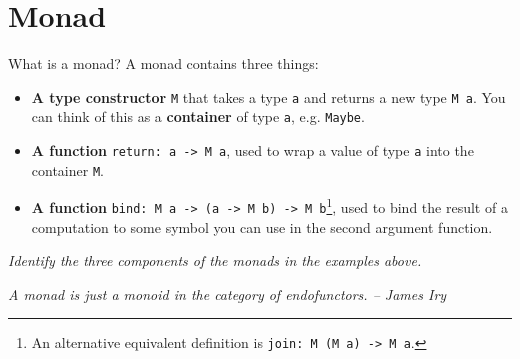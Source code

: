 \documentclass{beamer}
\begin{document}
\section{Monad}

\begin{frame}{What is a monad?}
	A monad contains three things:

	\begin{itemize}
		\item \textbf{A type constructor} {\tt M} that takes a type {\tt a} and returns a new type {\tt M~a}. You can think of this as a \textbf{container} of type {\tt a}, e.g. {\tt Maybe}.
		\item \textbf{A function} {\tt return: a -> M~a}, used to wrap a value of type {\tt a} into the container {\tt M}.
		\item \textbf{A function} {\tt bind: M~a~->~(a~->~M~b)~->~M~b}\footnote{An alternative equivalent definition is {\tt join: M (M a) -> M a}.}, used to bind the result of a computation to some symbol you can use in the second argument function.
	\end{itemize}

	\medskip\pause

	\em Identify the three components of the monads in the examples above. \em
	\medskip\pause

	\em A monad is just a monoid in the category of endofunctors. \em -- James Iry

\end{frame}
\end{document}

